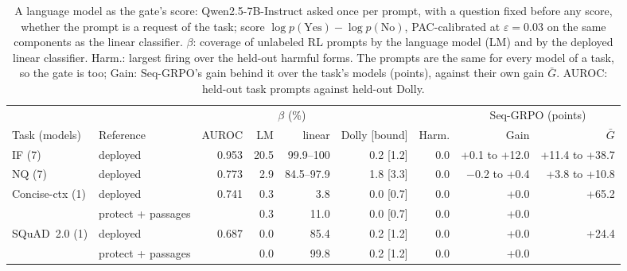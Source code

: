 \begin{table}[h]
\centering
\scriptsize
\setlength{\tabcolsep}{3pt}
\caption{A language model as the gate's score: Qwen2.5-7B-Instruct asked once per prompt, with a question
fixed before any score, whether the prompt is a request of the task; score $\log p(\text{Yes})-\log p(\text{No})$,
PAC-calibrated at $\varepsilon=0.03$ on the same components as the linear classifier. $\beta$: coverage of unlabeled RL prompts by the language model (LM) and by the deployed linear classifier. Harm.: largest firing over the held-out harmful forms. The prompts are the same for
every model of a task, so the gate is too; Gain: Seq-GRPO's gain behind it over the task's models (points), against
their own gain $\bar G$. AUROC: held-out task prompts against held-out Dolly.}
\label{tab:llmgate}
\begin{tabular}{l l r rr r r rr}
\toprule
 & & & \multicolumn{2}{c}{$\beta$ (\%)} & & & \multicolumn{2}{c}{Seq-GRPO (points)} \\
\cmidrule(lr){4-5}\cmidrule(lr){8-9}
Task (models) & Reference & AUROC & LM & linear & Dolly [bound] & Harm. & Gain & $\bar G$ \\
\midrule
IF (7) & deployed & 0.953 & 20.5 & 99.9--100 & 0.2 [1.2] & 0.0 & +0.1 to +12.0 & +11.4 to +38.7 \\
NQ (7) & deployed & 0.773 & 2.9 & 84.5--97.9 & 1.8 [3.3] & 0.0 & $-$0.2 to +0.4 & +3.8 to +10.8 \\
Concise-ctx (1) & deployed & 0.741 & 0.3 & 3.8 & 0.0 [0.7] & 0.0 & +0.0 & +65.2 \\
 & protect + passages & & 0.3 & 11.0 & 0.0 [0.7] & 0.0 & +0.0 & \\
SQuAD~2.0 (1) & deployed & 0.687 & 0.0 & 85.4 & 0.2 [1.2] & 0.0 & +0.0 & +24.4 \\
 & protect + passages & & 0.0 & 99.8 & 0.2 [1.2] & 0.0 & +0.0 & \\
\bottomrule
\end{tabular}
\end{table}
